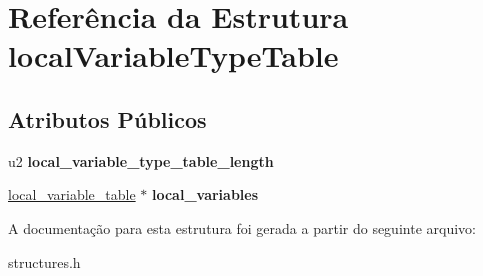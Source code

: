 \hypertarget{structlocalVariableTypeTable}{}\section{Referência da Estrutura local\+Variable\+Type\+Table}
\label{structlocalVariableTypeTable}
\subsection*{Atributos Públicos}
\begin{DoxyCompactItemize}
\item 
\mbox{\label{structlocalVariableTypeTable_a9d0ce3852fcf1ee2c60d8c098caaff76}} 
u2 {\bfseries local\+\_\+variable\+\_\+type\+\_\+table\+\_\+length}
\item 
\mbox{\label{structlocalVariableTypeTable_acb5bcd42df545b2aeb7517e01e1b5ed0}} 
\hyperlink{structlocal__variable__table}{local\+\_\+variable\+\_\+table} $\ast$ {\bfseries local\+\_\+variables}
\end{DoxyCompactItemize}


A documentação para esta estrutura foi gerada a partir do seguinte arquivo\+:\begin{DoxyCompactItemize}
\item 
structures.\+h\end{DoxyCompactItemize}
